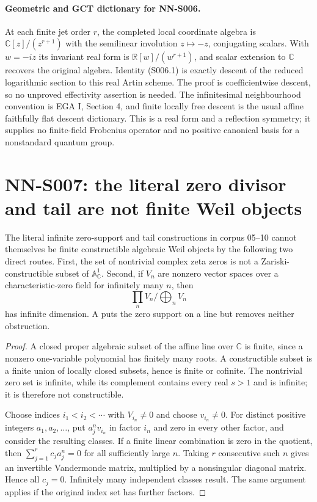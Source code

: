\paragraph{Geometric and GCT dictionary for NN-S006.}
At each finite jet order $r$, the completed local coordinate
algebra is $\mathbb C[z]/(z^{r+1})$ with the semilinear involution
$z\mapsto-z$, conjugating scalars. With $w=-iz$ its invariant
real form is $\mathbb R[w]/(w^{r+1})$, and scalar extension to
$\mathbb C$ recovers the original algebra. Identity (S006.1)
is exactly descent of the reduced logarithmic section to this
real Artin scheme. The proof is coefficientwise descent, so no
unproved effectivity assertion is needed. The infinitesimal
neighbourhood convention is EGA I, Section 4, and finite locally
free descent is the usual affine faithfully flat descent
dictionary. This is a real form and a reflection symmetry;
it supplies no finite-field Frobenius operator and no positive
canonical basis for a nonstandard quantum group.

\section{NN-S007: the literal zero divisor and tail are not finite Weil objects}
\label{sec:NN-S007}

\begin{theorem}[NN-S007]
The literal infinite zero-support and tail constructions in
corpus 05--10 cannot themselves be finite constructible
algebraic Weil objects by the following two direct routes.
First, the set of nontrivial complex zeta zeros is not a
Zariski-constructible subset of $\mathbb A^1_{\mathbb C}$.
Second, if $V_n$ are nonzero vector spaces over a characteristic-zero
field for infinitely many $n$, then
\[
 \prod_nV_n\big/\bigoplus_nV_n
\]
has infinite dimension. A puts the zero support on a line but
removes neither obstruction.
\end{theorem}

\begin{proof}
A closed proper algebraic subset of the affine line over
$\mathbb C$ is finite, since a nonzero one-variable polynomial
has finitely many roots. A constructible subset is a finite union
of locally closed subsets, hence is finite or cofinite. The
nontrivial zero set is infinite, while its complement contains
every real $s>1$ and is infinite; it is therefore not constructible.

Choose indices $i_1<i_2<\cdots$ with $V_{i_n}\ne0$ and
choose $v_{i_n}\ne0$. For distinct positive integers
$a_1,a_2,\ldots$, put $a_j^nv_{i_n}$ in factor $i_n$ and zero
in every other factor, and consider the resulting classes. If a finite linear
combination is zero in the quotient, then
$\sum_{j=1}^rc_ja_j^n=0$ for all sufficiently large $n$.
Taking $r$ consecutive such $n$ gives an invertible Vandermonde
matrix, multiplied by a nonsingular diagonal matrix. Hence all
$c_j=0$. Infinitely many independent classes result. The same
argument applies if the original index set has further factors.
\end{proof}

